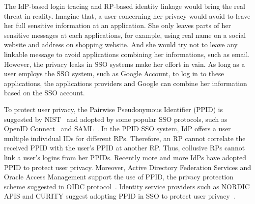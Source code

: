 The IdP-based login tracing and RP-based identity linkage would bring the real threat in reality. Imagine that, a user concerning her privacy would avoid to leave her full sensitive information at an application. She only leaves parts of her sensitive messages at each applications, for example, using real name on a social website and address on shopping website. And she would try not to leave any linkable message to avoid applications combining her informations, such as email.
However, the privacy leaks in SSO systems make her effort in vain. As long as a user employs the SSO system, such as Google Account, to log in to these applications, the applications providers and Google can combine her information based on the SSO account.


To protect user privacy, the Pairwise Pseudonymous Identifier (PPID) is suggested by NIST~\cite{NIST2017draft} and adopted by some popular SSO protocols, such as OpenID Connect~\cite{OpenIDConnect,} and SAML~\cite{SAMLIdentifier}. 
In the PPID SSO system, IdP offers a user multiple individual IDs for different RPs. 
Therefore, an RP cannot  correlate the received  PPID  with the user's PPID at another RP. Thus, collusive RPs cannot link a user's logins from her PPIDs. 
Recently more and more IdPs have adopted PPID to protect user privacy. Moreover, Active Directory Federation Services and Oracle Access Management support the use of PPID, the privacy protection scheme suggested in OIDC protocol~\cite{MS, Oracle}. Identity service providers such as NORDIC APIS and CURITY suggest adopting PPID in SSO to protect user privacy~\cite{Nordic, Curity}.

